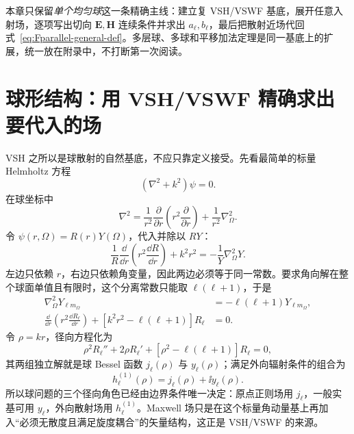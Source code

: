 本章只保留\emph{单个均匀球}这一条精确主线：建立复 VSH/VSWF 基底，展开任意入射场，逐项写出切向 $\bm E,\bm H$ 连续条件并求出 $a_\ell,b_\ell$，最后把散射近场代回式~\eqref{eq:Fparallel-general-def}。多层球、多球和平移加法定理是同一基底上的扩展，统一放在附录中，不打断第一次阅读。

\section{球形结构：用 VSH/VSWF 精确求出要代入的场}

VSH 之所以是球散射的自然基底，不应只靠定义接受。先看最简单的标量 Helmholtz 方程
\begin{equation}
(\nabla^2+k^2)\psi=0.
\label{eq:scalar-helmholtz-mie}
\end{equation}
在球坐标中
\begin{equation}
\nabla^2
=\frac{1}{r^2}\frac{\partial}{\partial r}
\left(r^2\frac{\partial}{\partial r}\right)
+\frac{1}{r^2}\nabla_\Omega^2.
\end{equation}
令 $\psi(r,\Omega)=R(r)Y(\Omega)$，代入并除以 $RY$：
\begin{equation}
\frac{1}{R}\frac{\dd}{\dd r}\left(r^2\frac{\dd R}{\dd r}\right)
+k^2r^2
=-\frac{1}{Y}\nabla_\Omega^2Y.
\end{equation}
左边只依赖 $r$，右边只依赖角变量，因此两边必须等于同一常数。要求角向解在整个球面单值且有限时，这个分离常数只能取 $\ell(\ell+1)$，于是
\begin{align}
\nabla_\Omega^2Y_{\ell m_\Omega}
&=-\ell(\ell+1)Y_{\ell m_\Omega},\\
\frac{\dd}{\dd r}\left(r^2\frac{\dd R_\ell}{\dd r}\right)
+\left[k^2r^2-\ell(\ell+1)\right]R_\ell&=0.
\label{eq:spherical-radial-equation}
\end{align}
令 $\rho=kr$，径向方程化为
\begin{equation}
\rho^2R_\ell''+2\rho R_\ell'
+\left[\rho^2-\ell(\ell+1)\right]R_\ell=0,
\end{equation}
其两组独立解就是球 Bessel 函数 $j_\ell(\rho)$ 与 $y_\ell(\rho)$；满足外向辐射条件的组合为
\begin{equation}
h_\ell^{(1)}(\rho)=j_\ell(\rho)+\ii y_\ell(\rho).
\end{equation}
所以球问题的三个径向角色已经由边界条件唯一决定：原点正则场用 $j_\ell$，一般实基可用 $y_\ell$，外向散射场用 $h_\ell^{(1)}$。Maxwell 场只是在这个标量角动量基上再加入“必须无散度且满足旋度耦合”的矢量结构，这正是 VSH/VSWF 的来源。


